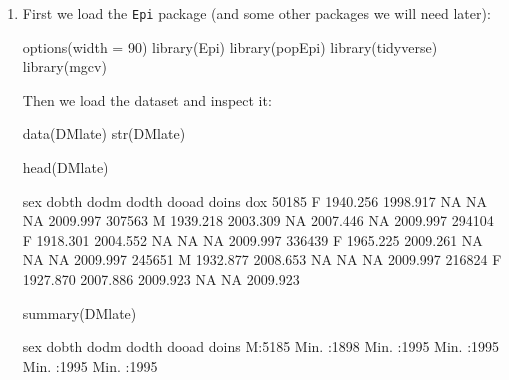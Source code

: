 \begin{enumerate}


\item First we load the \texttt{Epi} package (and some other packages
  we will need later):
\begin{Schunk}
\begin{Sinput}
 options(width = 90)
 library(Epi)
 library(popEpi)
 library(tidyverse)
 library(mgcv)
\end{Sinput}
\end{Schunk}
Then we load the dataset and inspect it:
\begin{Schunk}
\begin{Sinput}
 data(DMlate)
 str(DMlate)
\end{Sinput}
\begin{Sinput}
 head(DMlate)
\end{Sinput}
\begin{Soutput}
       sex    dobth     dodm    dodth    dooad doins      dox
50185    F 1940.256 1998.917       NA       NA    NA 2009.997
307563   M 1939.218 2003.309       NA 2007.446    NA 2009.997
294104   F 1918.301 2004.552       NA       NA    NA 2009.997
336439   F 1965.225 2009.261       NA       NA    NA 2009.997
245651   M 1932.877 2008.653       NA       NA    NA 2009.997
216824   F 1927.870 2007.886 2009.923       NA    NA 2009.923
\end{Soutput}
\begin{Sinput}
 summary(DMlate)
\end{Sinput}
\begin{Soutput}
 sex          dobth           dodm          dodth          dooad          doins     
 M:5185   Min.   :1898   Min.   :1995   Min.   :1995   Min.   :1995   Min.   :1995  

\end{Soutput}
\end{Schunk}
\end{enumerate}
